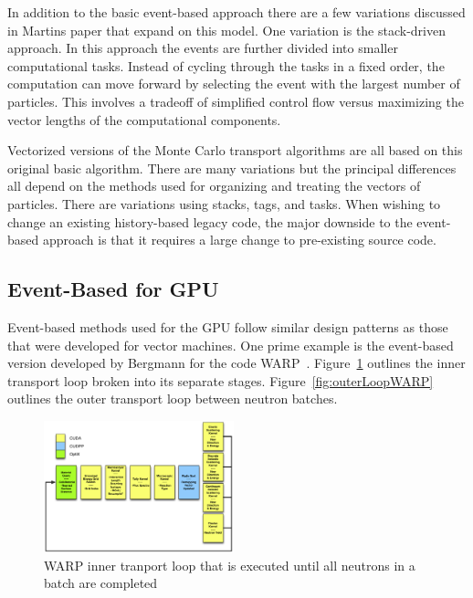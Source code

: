 In addition to the basic event-based approach there are a few variations discussed in Martins paper that expand on this model.
%
One variation is the stack-driven approach.
%
In this approach the events are further divided into smaller computational tasks.
%
Instead of cycling through the tasks in a fixed order, the computation can move forward by selecting the event with the largest number of particles.
%
This involves a tradeoff of simplified control flow versus maximizing the vector lengths of the computational components.
%

%
Vectorized versions of the Monte Carlo transport algorithms are all based on this original basic algorithm.
%
There are many variations but the principal differences all depend on the methods used for organizing and treating the vectors of particles.
%
There are variations using stacks, tags, and tasks.
%
When wishing to change an existing history-based legacy code, the major downside to the event-based approach is that it requires a large change to pre-existing source code.
%

\subsection*{\textbf{Event-Based for GPU}}

%
Event-based methods used for the GPU follow similar design patterns as those that were developed for vector machines.
%
One prime example is the event-based version developed by Bergmann for the code WARP~\cite{2014development}.
%
Figure~\ref{fig:innerLoopWARP} outlines the inner transport loop broken into its separate stages.
%
Figure~\ref{fig:outerLoopWARP} outlines the outer transport loop between neutron batches.
%

\begin{figure}
\includegraphics[width=0.49\textwidth]{InnerLoopWARP}
\caption{WARP inner tranport loop that is executed until all neutrons in a batch are completed~\cite{2014development}}
\label{fig:innerLoopWARP}
\end{figure}

